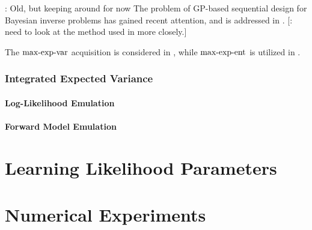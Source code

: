 \documentclass[12pt]{article}
\begin{document}
\todo: Old, but keeping around for now 
The problem of GP-based sequential design for Bayesian inverse problems  
has gained recent attention, and is addressed in 
\cite{SinsbeckNowak, Surer2023sequential, VehtariParallelGP, briol2017sampling, ranjan2016inverse, 
	landslideCalibration, KandasamyActiveLearning2015, Kandasamy_2017, wang2018adaptive,   
	weightedIVAR, quantileApprox, hydrologicalModel}. 
[\todo: need to look at the method used in \cite{quantileApprox, hydrologicalModel} more closely.]

The $\textrm{max-exp-var}$ acquisition is considered in 
\cite{KandasamyActiveLearning2015, Kandasamy_2017}, 
while $\textrm{max-exp-ent}$ is utilized in \cite{wang2018adaptive, landslideCalibration}. 

\subsubsection{Integrated Expected Variance}

\paragraph{Log-Likelihood Emulation}

\paragraph{Forward Model Emulation}

\section{Learning Likelihood Parameters} \label{section_lik_par}

\section{Numerical Experiments}

\end{document}
